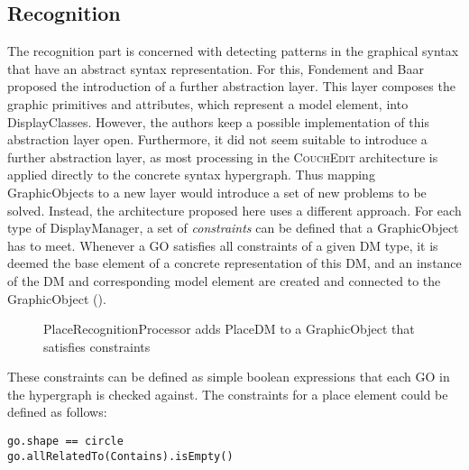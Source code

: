 \subsection{Recognition}
\label{sec:recognition}
The recognition part is concerned with detecting patterns in the graphical syntax that have an abstract syntax representation. For this, Fondement and Baar proposed the introduction of a further abstraction layer. This layer composes the graphic primitives and attributes, which represent a model element, into DisplayClasses. However, the authors keep a possible implementation of this abstraction layer open. Furthermore, it did not seem suitable to introduce a further abstraction layer, as most processing in the \textsc{CouchEdit} architecture is applied directly to the concrete syntax hypergraph. Thus mapping GraphicObjects to a new layer would introduce a set of new problems to be solved. Instead, the architecture proposed here uses a different approach. For each type of DisplayManager, a set of \emph{constraints} can be defined that a GraphicObject has to meet. Whenever a GO satisfies all constraints of a given DM type, it is deemed the base element of a concrete representation of this DM, and an instance of the DM and corresponding model element are created and connected to the GraphicObject ().


\begin{figure}
  \centering
  
  \caption{PlaceRecognitionProcessor adds PlaceDM to a GraphicObject that satisfies constraints}
  \label{fig:place-recognition}
\end{figure}

\pagebreak
These constraints can be defined as simple boolean expressions that each GO in the hypergraph is checked against. The constraints for a place element could be defined as follows:

\begin{lstlisting}[language=OCL,caption={Possible constraints to detect GOs representing a place},captionpos=b]
go.shape == circle
go.allRelatedTo(Contains).isEmpty()
\end{lstlisting}

